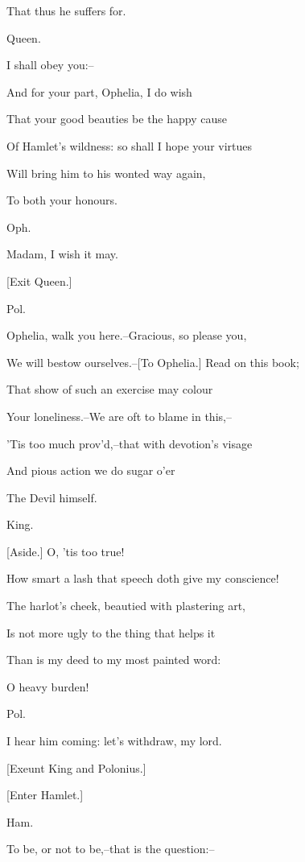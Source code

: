 \documentclass[12pt]{book}
\begin{document}
That thus he suffers for.



Queen.

I shall obey you:--

And for your part, Ophelia, I do wish

That your good beauties be the happy cause

Of Hamlet's wildness: so shall I hope your virtues

Will bring him to his wonted way again,

To both your honours.



Oph.

Madam, I wish it may.



[Exit Queen.]



Pol.

Ophelia, walk you here.--Gracious, so please you,

We will bestow ourselves.--[To Ophelia.] Read on this book;

That show of such an exercise may colour

Your loneliness.--We are oft to blame in this,--

'Tis too much prov'd,--that with devotion's visage

And pious action we do sugar o'er

The Devil himself.



King.

[Aside.] O, 'tis too true!

How smart a lash that speech doth give my conscience!

The harlot's cheek, beautied with plastering art,

Is not more ugly to the thing that helps it

Than is my deed to my most painted word:

O heavy burden!



Pol.

I hear him coming: let's withdraw, my lord.



[Exeunt King and Polonius.]



[Enter Hamlet.]



Ham.

To be, or not to be,--that is the question:--
\end{document}
